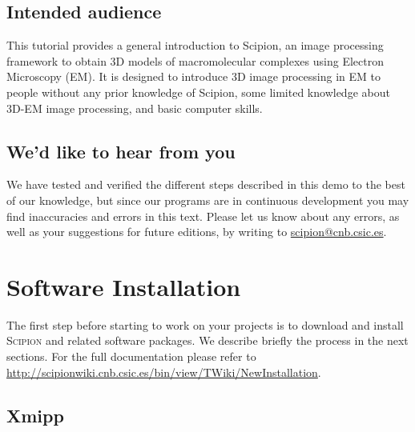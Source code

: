 \documentclass[12pt]{article} %
\newcommand{\scipion}{\textsc{Scipion} }
\begin{document}


\subsection*{Intended audience}

This tutorial provides a general introduction to Scipion, an image
processing framework to obtain 3D models of macromolecular complexes
using Electron Microscopy (EM). It is designed to introduce 3D image
processing in EM to people without any prior knowledge of Scipion,
some limited knowledge about 3D-EM image processing, and basic
computer skills.

\subsection*{We'd like to hear from you}

We have tested and verified the different steps described in this demo
to the best of our knowledge, but since our programs are in continuous
development you may find inaccuracies and errors in this text. Please
let us know about any errors, as well as your suggestions for
future editions, by writing to
\href{mailto:scipion@cnb.csic.es}{scipion@cnb.csic.es}.

\newpage



\tableofcontents %

\newpage %


\section{Software Installation}

The first step before starting to work on your projects is to download
and install \scipion and related software packages. We describe
briefly the process in the next sections. For the full documentation please refer to
\url{http://scipionwiki.cnb.csic.es/bin/view/TWiki/NewInstallation}.

\subsection{Xmipp}
\end{document}

